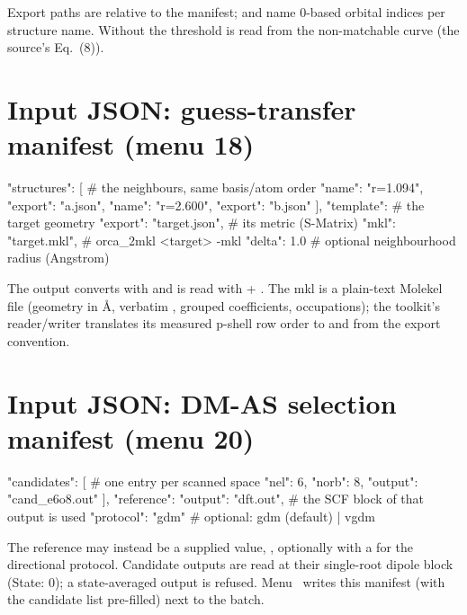 Export paths are relative to the manifest;  and 
name 0-based orbital indices per structure name.  Without  the
threshold is read from the non-matchable curve (the source's Eq.~(8)).

\section{Input JSON: guess-transfer manifest (menu 18)}

\begin{codeblock}
{
  "structures": [                         # the neighbours, same basis/atom order
    {"name": "r=1.094", "export": "a.json"},
    {"name": "r=2.600", "export": "b.json"}
  ],
  "template": {                           # the target geometry
    "export": "target.json",              # its metric (S-Matrix)
    "mkl": "target.mkl"},                 # orca_2mkl <target> -mkl
  "delta": 1.0                            # optional neighbourhood radius (Angstrom)
}
\end{codeblock}

The output  converts with
 and is read with  +
.  The mkl is a plain-text Molekel file (geometry in \AA,
verbatim , grouped coefficients, occupations); the toolkit's
reader/writer translates its measured p-shell row order to and from the
export convention.

\section{Input JSON: DM-AS selection manifest (menu 20)}

\begin{codeblock}
{
  "candidates": [                         # one entry per scanned space
    {"nel": 6, "norb": 8, "output": "cand_e6o8.out"}
  ],
  "reference": {"output": "dft.out"},     # the SCF block of that output is used
  "protocol": "gdm"                       # optional: gdm (default) | vgdm
}
\end{codeblock}

The reference may instead be a supplied value,
, optionally
with a  for the directional protocol.  Candidate outputs are
read at their single-root dipole block (State: 0); a state-averaged output is
refused.  Menu~ writes this manifest (with the candidate list
pre-filled) next to the batch.

